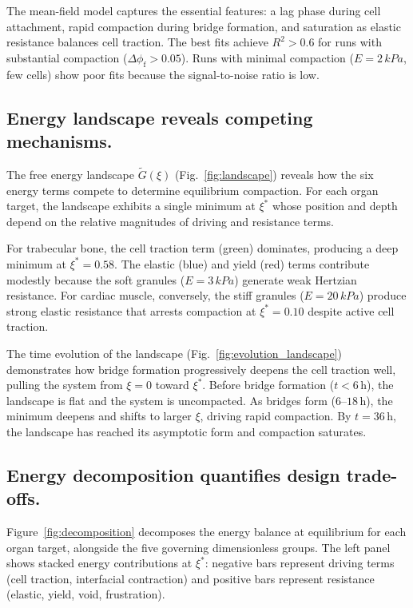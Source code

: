 \documentclass[9pt,twocolumn,twoside]{pnas-new}
\newcommand{\phif}{\phi_\mathrm{f}}
\newcommand{\xistar}{\xi^{*}}
\newcommand{\Gtilde}{\tilde{G}}
\newcommand{\kPa}{\,\si{kPa}}
\begin{document}
The mean-field model captures the essential features: a lag phase during
cell attachment, rapid compaction during bridge formation, and saturation as
elastic resistance balances cell traction. The best fits achieve $R^2 >
0.6$ for runs with substantial compaction ($\Delta\phif > 0.05$). Runs
with minimal compaction ($E = 2\kPa$, few cells) show poor fits because the
signal-to-noise ratio is low.

\subsection*{Energy landscape reveals competing mechanisms.}

The free energy landscape $\Gtilde(\xi)$ (Fig.~\ref{fig:landscape}) reveals
how the six energy terms compete to determine equilibrium compaction. For
each organ target, the landscape exhibits a single minimum at $\xistar$
whose position and depth depend on the relative magnitudes of driving and
resistance terms.

For trabecular bone, the cell traction term (green) dominates, producing a
deep minimum at $\xistar = 0.58$. The elastic (blue) and yield (red) terms
contribute modestly because the soft granules ($E = 3\kPa$) generate weak
Hertzian resistance. For cardiac muscle, conversely, the stiff granules ($E
= 20\kPa$) produce strong elastic resistance that arrests compaction at
$\xistar = 0.10$ despite active cell traction.

The time evolution of the landscape (Fig.~\ref{fig:evolution_landscape})
demonstrates how bridge formation progressively deepens the cell traction
well, pulling the system from $\xi = 0$ toward $\xistar$. Before bridge
formation ($t < 6$\,h), the landscape is flat and the system is uncompacted.
As bridges form ($6$--$18$\,h), the minimum deepens and shifts to larger
$\xi$, driving rapid compaction. By $t = 36$\,h, the landscape has reached
its asymptotic form and compaction saturates.

\subsection*{Energy decomposition quantifies design trade-offs.}

Figure~\ref{fig:decomposition} decomposes the energy balance at equilibrium
for each organ target, alongside the five governing dimensionless groups. The
left panel shows stacked energy contributions at $\xistar$: negative bars
represent driving terms (cell traction, interfacial contraction) and positive
bars represent resistance (elastic, yield, void, frustration).
\end{document}
